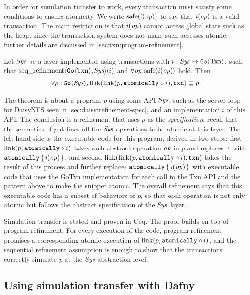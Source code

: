 In order for simulation transfer to work, every transaction must satisfy some
conditions to ensure atomicity. We write $\mathrm{safe}(i(\mathit{op}))$ to say that $i(\mathit{op})$ is a
valid transaction. The main restriction is that $i(\mathit{op})$ cannot access global state
such as the heap, since the transaction system does not make such accesses
atomic; further details are discussed in \cref{sec:txn:program-refinement}.

\begin{theorem}
  Let $\textit{Sys}$ be a layer implemented using transactions with
$i : \textit{Sys} \to \mathtt{Go}\langle \mathrm{Txn} \rangle$, such that
$\operatorname{seq\_refinement}\langle \mathtt{Go}\langle \mathrm{Txn} \rangle, \textit{Sys} \rangle(i)$ and
$\forall \mathit{op}.\, \mathrm{safe}(i(\mathit{op}))$ hold. Then
\[
  \forall p : \mathtt{Go}\langle \mathit{Sys} \rangle, \mathrm{link}(\mathrm{link}(p, \mathtt{atomically}\circ i), \texttt{txn}) \sqsubseteq p.
\]
\label{thm:gotxn-transfer}
\end{theorem}
\nopagebreak

The theorem is about a program $p$ using some API $\mathit{Sys}$, such as the server
loop for DaisyNFS seen in \cref{sec:daisy:refinement-spec}, and an
implementation $i$ of this API.\@
The conclusion is a refinement that uses $p$ as the \emph{specification}; recall
that the semantics of $p$ defines all the $\mathit{Sys}$ operations to be atomic at this
layer. The left-hand side is the executable code for this program, derived in
two steps: first $\mathrm{link}(p, \mathtt{atomically}\circ i)$ takes each abstract operation
$\mathit{op}$ in $p$ and replaces it with $\mathtt{atomically}\,\{\, i(\mathit{op}) \,\}$, and second
$\mathrm{link}(\mathrm{link}(p, \mathtt{atomically}\circ i), \texttt{txn})$ takes the result of this process and
further replaces $\mathtt{atomically}\,\{\, i(\mathit{op}) \,\}$ with executable code that uses the GoTxn
implementation for each call to the Txn API and the  pattern above to
make the snippet atomic. The overall refinement says that this executable code
has a subset of behaviors of $p$, so that each operation is not only atomic but
follows the abstract specification of the $\mathit{Sys}$ layer.

Simulation transfer is stated and proven in Coq. The proof builds on top of
program refinement. For every execution of the code, program refinement promises
a corresponding atomic execution of $\mathrm{link}(p, \mathtt{atomically}\circ i)$, and the
sequential refinement assumption is enough to show that the transactions
correctly simulate $p$ at the $\mathit{Sys}$ abstraction level.

\subsection{Using simulation transfer with Dafny}%
\label{sec:daisy:proof-dafny}

